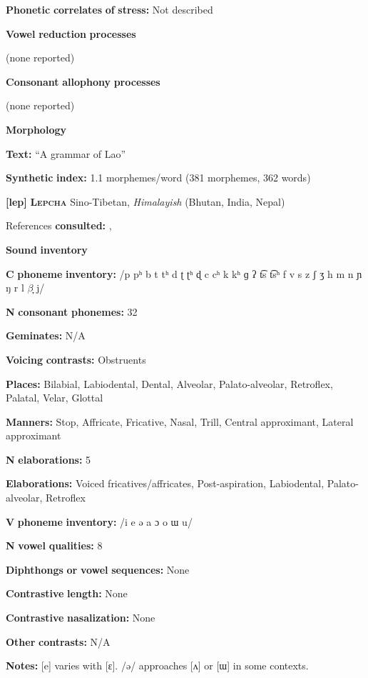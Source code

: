 \begin{styleBody}
\textbf{Phonetic} \textbf{correlates} \textbf{of} \textbf{stress:} Not described

\textbf{Vowel} \textbf{reduction} \textbf{processes}

(none reported)

\textbf{Consonant} \textbf{allophony} \textbf{processes}

(none reported)

\textbf{Morphology}

\textbf{Text:} “A grammar of Lao” \citep[488-497]{Enfield2007}

\textbf{Synthetic} \textbf{index:} 1.1 morphemes/word (381 morphemes, 362 words)

\textbf{[lep]}   \textbf{\textsc{Lepcha}}    Sino-Tibetan, \textit{Himalayish} (Bhutan, India, Nepal)

References \textbf{consulted:} \citet{Plaisier2007}, \citet{Sprigg1966}

\textbf{Sound} \textbf{inventory}

\textbf{C} \textbf{phoneme} \textbf{inventory:} /p pʰ b t tʰ d ʈ ʈʰ ɖ c cʰ k kʰ ɡ ʔ t͡s t͡sʰ f v s z ʃ ʒ h m n ɲ ŋ r l $\beta ̞$ j/

\textbf{N} \textbf{consonant} \textbf{phonemes:} 32

\textbf{Geminates:} N/A

\textbf{Voicing} \textbf{contrasts:} Obstruents

\textbf{Places:} Bilabial, Labiodental, Dental, Alveolar, Palato-alveolar, Retroflex, Palatal, Velar, Glottal

\textbf{Manners:} Stop, Affricate, Fricative, Nasal, Trill, Central approximant, Lateral approximant

\textbf{N} \textbf{elaborations:} 5

\textbf{Elaborations:} Voiced fricatives/affricates, Post-aspiration, Labiodental, Palato-alveolar, Retroflex

\textbf{V} \textbf{phoneme} \textbf{inventory:} /i e ə a ɔ o ɯ u/

\textbf{N} \textbf{vowel} \textbf{qualities:} 8

\textbf{Diphthongs} \textbf{or} \textbf{vowel} \textbf{sequences:} None

\textbf{Contrastive} \textbf{length:} None

\textbf{Contrastive} \textbf{nasalization:} None

\textbf{Other} \textbf{contrasts:} N/A

\textbf{Notes:} [e] varies with [ɛ]. /ə/ approaches [ʌ] or [ɯ] in some contexts.


\end{styleBody}
